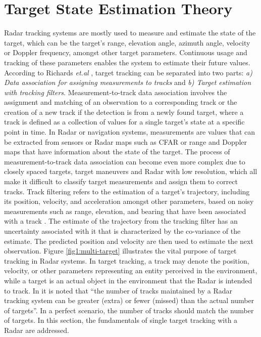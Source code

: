 \section{Target State Estimation Theory}
\ac{Radar} tracking systems are mostly used to measure and estimate the state of the target, which can be the target's range,  elevation angle, azimuth angle, velocity or Doppler frequency, amongst other target parameters. Continuous usage and tracking of these parameters enables the system to estimate their future values. According to Richards \textit{et.al} \cite{Richards2010}, target tracking can be separated into two parts: \textit{a)  Data association for assigning measurements to tracks} and \textit{b) Target estimation with tracking filters}.
\newline
\newline
Measurement-to-track data association involves the assignment and matching of an observation to a corresponding track or the creation of a new track if the detection is from a newly found target, where a track is defined as a collection of values for a single target's state at a specific point in time. In \ac{Radar} or navigation systems, measurements are values that can be extracted from sensors or \ac{Radar} maps such as \ac{CFAR} or range and Doppler maps that have information about the state of the target. The process of measurement-to-track data association can become even more complex due to closely spaced targets, target maneuvers and \ac{Radar} with low resolution, which all make it difficult to classify target measurements and assign them to correct tracks.
\newline
\newline
Track filtering refers to the estimation of a target's trajectory, including its position, velocity, and acceleration amongst other parameters, based on noisy measurements such as range, elevation, and bearing that have been associated with a track \cite{Richards2010}. The estimate of the trajectory from the tracking filter has an uncertainty associated with it that is characterized by the co-variance of the estimate. The predicted position and velocity are then used to estimate the next observation. Figure \ref{fig1:multi-target} illustrates the vital purpose of target tracking in \ac{Radar} systems. In target tracking, a track may denote the position, velocity, or other parameters representing an entity perceived in the environment, while a target is an actual object in the environment that the \ac{Radar} is intended to track. In \cite{Richards2010} it is noted that ``the number of tracks maintained by a \ac{Radar} tracking system can be greater (extra) or fewer (missed) than the actual number of targets''. In a perfect scenario, the number of tracks should match the number of targets. In this section, the fundamentals of single target tracking with a \ac{Radar} are addressed.

